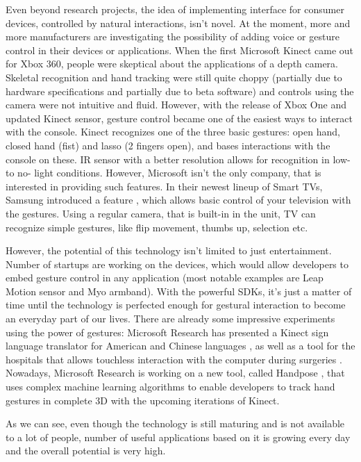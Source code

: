\documentclass[a4paper,11pt,oneside]{article}
\begin{document}
Even beyond research projects, the idea of implementing interface for consumer devices, controlled by natural interactions, isn't novel. At the moment, more and more manufacturers are investigating the possibility of adding voice or gesture control in their devices or applications. When the first Microsoft Kinect came out for Xbox 360, people were skeptical about the applications of a depth camera. Skeletal recognition and hand tracking were still quite choppy (partially due to hardware specifications and partially due to beta software) and controls using the camera were not intuitive and fluid. However, with the release of Xbox One and updated Kinect sensor, gesture control became one of the easiest ways to interact with the console. Kinect recognizes one of the three basic gestures: open hand, closed hand (fist) and lasso (2 fingers open), and bases interactions with the console on these. IR sensor with a better resolution allows for recognition in low- to no- light conditions. However, Microsoft isn't the only company, that is interested in providing such features. In their newest lineup of Smart TVs, Samsung introduced a feature \cite{SM01}, which allows basic control of your television with the gestures. Using a regular camera, that is built-in in the unit, TV can recognize simple gestures, like flip movement, thumbs up, selection etc.

However, the potential of this technology isn't limited to just entertainment. Number of startups are working on the devices, which would allow developers to embed gesture control in any application (most notable examples are Leap Motion sensor and Myo armband). With the powerful SDKs, it's just a matter of time until the technology is perfected enough for gestural interaction to become an everyday part of our lives. There are already some impressive experiments using the power of gestures: Microsoft Research has presented a Kinect sign language translator for American and Chinese languages \cite{MS02}, as well as a tool for the hospitals that allows touchless interaction with the computer during surgeries \cite{MS03}. Nowadays, Microsoft Research is working on a new tool, called Handpose \cite{MS04}, that uses complex machine learning algorithms to enable developers to track hand gestures in complete 3D with the upcoming iterations of Kinect.

As we can see, even though the technology is still maturing and is not available to a lot of people, number of useful applications based on it is growing every day and the overall potential is very high.
\end{document}
